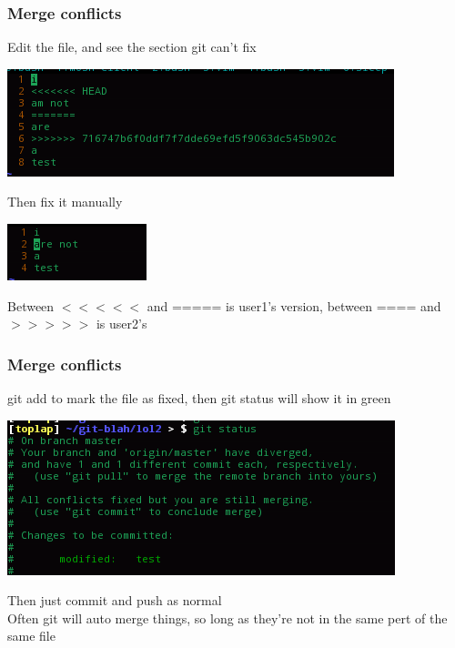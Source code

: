 \documentclass[xcolor=dvipsnames]{beamer}
\begin{document}
\begin{frame}
    \frametitle{Merge conflicts}

    Edit the file, and see the section git can't fix

    \begin{center}
        \includegraphics[scale=0.4]{mergeconflict3.png}
    \end{center}

    Then fix it manually

    \begin{center}
        \includegraphics[scale=0.4]{mergeconflict4.png}
    \end{center}

    Between $<<<<<$ and ===== is user1's version, between ==== and $>>>>>$ is user2's
\end{frame}


\begin{frame}
    \frametitle{Merge conflicts}

    git add to mark the file as fixed, then git status will show it in green

    \begin{center}
        \includegraphics[scale=0.4]{mergeconflict5.png}
    \end{center}

    Then just commit and push as normal\\
    Often git will auto merge things, so long as they're not in the same pert of the same file
\end{frame}
\end{document}
